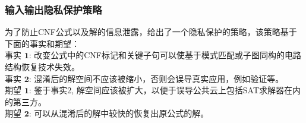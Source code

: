 \subsubsection{输入输出隐私保护策略}
为了防止CNF公式以及解的信息泄露，给出了一个隐私保护的策略，该策略基于下面的事实和期望：
\\$\textbf{事实 1:}$ 改变公式中的CNF标记和关键子句可以使基于模式匹配或子图同构的电路结构恢复技术失效。
\\$\textbf{事实 2:}$ 混淆后的解空间不应该被缩小，否则会误导真实应用，例如验证等。
\\$\textbf{期望 1:}$ 鉴于事实2, 解空间应该被扩大，以便于误导公共云上包括SAT求解器在内的第三方。
\\$\textbf{期望 2:}$ 可以从混淆后的解中较快的恢复出原公式的解。
